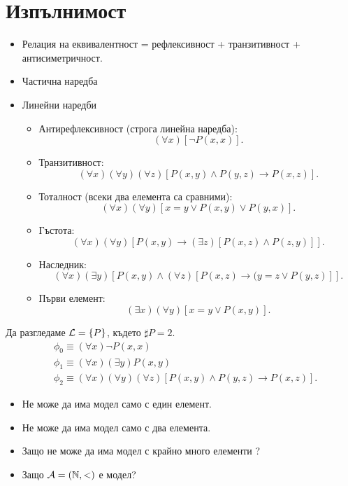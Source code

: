 \section{Изпълнимост}

\begin{itemize}
\item
  Релация на еквивалентност = рефлексивност + транзитивност + антисиметричност.
\item
  Частична наредба
\item
  Линейни наредби
  \begin{itemize}
  \item
    Антирефлексивност (строга линейна наредба):
    \[(\forall x)[\neg P(x,x)].\]
  \item
    Транзитивност:
    \[(\forall x)(\forall y)(\forall z)[P(x,y) \land P(y,z) \to P(x,z)].\]
  \item
    Тоталност (всеки два елемента са сравними):
    \[(\forall x)(\forall y)[x = y \lor P(x,y) \lor P(y,x)].\]
  \item
    Гъстота:
    \[(\forall x)(\forall y)[P(x,y) \to (\exists z)[P(x,z) \land P(z,y)]].\]
  \item
    Наследник:
    \[(\forall x)(\exists y)[P(x,y) \land (\forall z)[P(x,z) \to (y = z \lor P(y,z)]].\]
  \item
    Първи елемент:
    \[(\exists x)(\forall y)[x = y \lor P(x,y)].\]
  \end{itemize}
\end{itemize}

\begin{example}
  Да разгледаме $\mathcal{L} = \{P\}$, където $\sharp P = 2$.
  \begin{align*}
    & \phi_0 \equiv (\forall x) \neg P(x,x)\\
    & \phi_1 \equiv (\forall x)(\exists y)P(x,y) \\
    & \phi_2 \equiv (\forall x)(\forall y)(\forall z)[P(x,y) \land P(y,z) \to P(x,z)].
  \end{align*}
\end{example}
\begin{hint}
  \begin{itemize}
  \item
    Не може да има модел само с един елемент.
  \item
    Не може да има модел само с два елемента.
  \item
    Защо не може да има модел с крайно много елементи ?
  \item
    Защо $\mathcal{A} = (\mathbb{N}, <)$ е модел?
  \end{itemize}
\end{hint}


